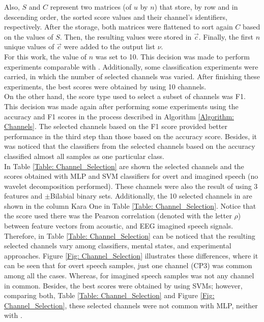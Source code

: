 Also, $S$ and $C$ represent two matrices (of $u$ by $n$) that store, by row and in descending order, the sorted score values and their channel's identifiers, respectively. After the storage, both matrices were flattened to sort again $C$ based on the values of $S$. Then, the resulting values were stored in $\vec{c}$. Finally, the first $n$ unique values of $\vec{c}$ were added to the output list $\nu$.\\

For this work, the value of $n$ was set to 10. This decision was made to perform experiments comparable with \cite{zhao2015classifying,zhao2013combining}. Additionally, some classification experiments were carried, in which the number of selected channels was varied. After finishing these \linebreak[4]experiments, the best scores were obtained by using 10 channels.\\

On the other hand, the score type used to select a subset of channels was F1. This decision was made again after performing some experiments using the accuracy and F1 scores in the process described in Algorithm \ref{Algorithm: Channels}. The selected channels based on the F1 score provided better performance in the third step than those based on the accuracy score. Besides, it was noticed that the classifiers from the selected channels based on the accuracy classified almost all samples as one particular class.\\

In Table \ref{Table: Channel_Selection} are shown the selected channels and the scores obtained with MLP and SVM classifiers for overt and imagined speech (no wavelet decomposition performed). These channels were also the result of using 3 features and $\pm$Bilabial binary sets. Additionally, the 10 selected channels in \cite{zhao2015classifying,zhao2013combining} are shown in the column Kara One in Table \ref{Table: Channel_Selection}. Notice that the score used there was the Pearson correlation (denoted with the letter $\rho$) between feature vectors from acoustic, and EEG imagined speech signals.\\

Therefore, in Table \ref{Table: Channel_Selection} can be noticed that the resulting selected channels vary among classifiers, mental states, and experimental approaches. Figure \ref{Fig: Channel_Selection} illustrates these \linebreak[4]differences, where it can be seen that for overt speech samples, just one channel (CP3) was common among all the cases. Whereas, for imagined speech samples was not any channel in common. Besides, the best scores were obtained by using SVMs; however, comparing both, Table \ref{Table: Channel_Selection} and Figure \ref{Fig: Channel_Selection}, these selected channels were not common with MLP, neither with \cite{zhao2015classifying,zhao2013combining}.\\

